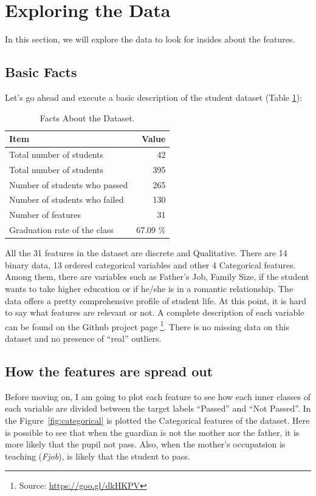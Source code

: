 \documentclass[a4paper]{article}
\begin{document}
\section{Exploring the Data}
\label{sec:exploring_data}
In this section, we will explore the data to look for insides about the features.

\subsection{Basic Facts}
Let's go ahead and execute a basic description of the student dataset (Table \ref{tab:basicfacts}):

\begin{table}[ht]
\centering
\begin{tabular}{l|r}
Item & Value \\\hline
Total number of students & 42 \\
Total number of students & 395 \\
Number of students who passed & 265 \\
Number of students who failed & 130 \\
Number of features & 31 \\
Graduation rate of the class & 67.09 \%

\end{tabular}
\caption{\label{tab:basicfacts}Facts About the Dataset.}
\end{table}

All the 31 features in the dataset are discrete and Qualitative. There are 14 binary data, 13 ordered categorical variables and other 4 Categorical features. Among them, there are variables such as Father's Job, Family Size, if the student wants to take higher education or if he/she is in a romantic relationship. The data offers a pretty comprehensive profile of student life. At this point, it is hard to say what features are relevant or not. A complete description of each variable can be found on the Github project page \footnote{Source: \url{https://goo.gl/dkHKPV}}. There is no missing data on this dataset and no presence of ``real'' outliers.

\subsection{How the features are spread out}
Before moving on, I am going to plot each feature to see how each inner classes of each variable are divided between the target labels ``Passed'' and ``Not Passed''. In the Figure~\ref{fig:categorical} is plotted the Categorical features of the dataset. Here is possible to see that when the guardian is not the mother nor the father, it is more likely that the pupil not pass. Also, when the mother's occupatsion is teaching (\textit{Fjob}), is likely that the student to pass.
\end{document}
